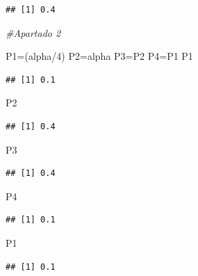 \documentclass[
]{article}
\newenvironment{Shaded}{\begin{snugshade}}{\end{snugshade}}
\newcommand{\CommentTok}[1]{\textcolor[rgb]{0.56,0.35,0.01}{\textit{#1}}}
\newcommand{\DecValTok}[1]{\textcolor[rgb]{0.00,0.00,0.81}{#1}}
\newcommand{\NormalTok}[1]{#1}
\newcommand{\OtherTok}[1]{\textcolor[rgb]{0.56,0.35,0.01}{#1}}
\newcommand{\SpecialCharTok}[1]{\textcolor[rgb]{0.00,0.00,0.00}{#1}}
\begin{document}
\begin{verbatim}
## [1] 0.4
\end{verbatim}

\begin{Shaded}
\begin{Highlighting}[]
\CommentTok{\#Apartado 2}

\NormalTok{P1}\OtherTok{=}\NormalTok{(alpha}\SpecialCharTok{/}\DecValTok{4}\NormalTok{)}
\NormalTok{P2}\OtherTok{=}\NormalTok{alpha}
\NormalTok{P3}\OtherTok{=}\NormalTok{P2}
\NormalTok{P4}\OtherTok{=}\NormalTok{P1}
\NormalTok{P1}
\end{Highlighting}
\end{Shaded}

\begin{verbatim}
## [1] 0.1
\end{verbatim}

\begin{Shaded}
\begin{Highlighting}[]
\NormalTok{P2}
\end{Highlighting}
\end{Shaded}

\begin{verbatim}
## [1] 0.4
\end{verbatim}

\begin{Shaded}
\begin{Highlighting}[]
\NormalTok{P3}
\end{Highlighting}
\end{Shaded}

\begin{verbatim}
## [1] 0.4
\end{verbatim}

\begin{Shaded}
\begin{Highlighting}[]
\NormalTok{P4}
\end{Highlighting}
\end{Shaded}

\begin{verbatim}
## [1] 0.1
\end{verbatim}

\begin{Shaded}
\begin{Highlighting}[]
\NormalTok{P1}
\end{Highlighting}
\end{Shaded}

\begin{verbatim}
## [1] 0.1
\end{verbatim}
\end{document}
